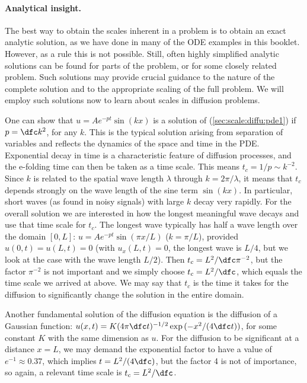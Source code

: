 \documentclass[graybox,envcountchap,sectrefs,final]{svmonodo}
\begin{document}
\paragraph{Analytical insight.}
The best way to obtain the scales inherent in a problem is to obtain
an exact analytic solution, as we have done in many of the ODE
examples in this booklet. However, as a rule this is not possible.
Still, often highly
simplified analytic solutions can be found for parts of the problem,
or for some closely related problem. Such solutions may provide
crucial guidance to the nature of the complete solution and to the
appropriate scaling of the full problem. We will employ such solutions
now to learn about scales in diffusion problems.

One can show that $u=Ae^{-pt}\sin (kx)$ is a solution of
(\ref{sec:scale:diffu:pde1}) if $p=\dfc k^2$, for any $k$.
This is the typical solution arising from separation of variables
and reflects the dynamics of the space and time in the PDE.
Exponential decay in
time is a characteristic feature of diffusion processes, and
the e-folding time can then be taken as a time scale. This means
$t_c = 1/p \sim k^{-2}$. Since $k$ is related to the spatial
wave length $\lambda$
through $k=2\pi/\lambda$, it means that $t_c$ depends strongly on the wave
length of the sine term $\sin(kx)$.
In particular, short waves (as found in noisy signals) with
large $k$ decay very rapidly.
For the overall solution we are interested in how the longest meaningful
wave decays and use that time scale for $t_c$. The longest wave
typically has half a wave length over the domain $[0,L]$:
$u = Ae^{-pt}\sin(\pi x/L)$ ($k=\pi/L$), provided $u(0,t)=u(L,t)=0$
(with $u_x(L,t)=0$, the longest wave is $L/4$, but we look at the
case with the wave length $L/2$). Then $t_c=L^2/\dfc \pi^{-2}$,
but the factor $\pi^{-2}$ is not important and we simply choose
$t_c=L^2/\dfc$, which equals the time scale we arrived at above.
We may say that $t_c$ is the time it takes for the diffusion to
significantly change the solution in the entire domain.

Another fundamental solution of the diffusion equation is the
diffusion of a Gaussian function: $u(x,t)=K(4\pi\dfc
t)^{-1/2}\exp{(-x^2/(4\dfc t))}$, for some constant $K$ with
the same dimension as $u$. For the diffusion to be significant
at a distance $x=L$, we may demand the exponential factor to have a
value of $e^{-1}\approx 0.37$, which implies $t=L^2/(4\dfc)$, but the
factor 4 is not of importance, so again, a relevant time scale is
$t_c=L^2/\dfc$.
\end{document}
